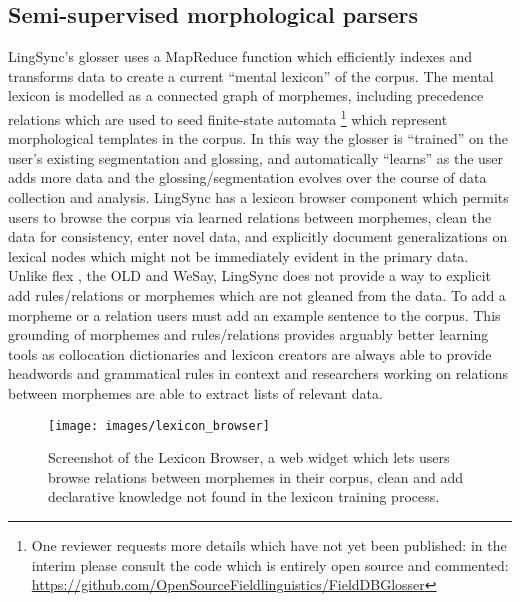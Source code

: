 \documentclass[11pt]{article}
\begin{document}
\subsection{Semi-supervised morphological parsers}
 \label{sec:lingsync-glosser} 

LingSync's glosser uses a MapReduce function which efficiently indexes and transforms data 
 to create a current ``mental lexicon'' of the corpus.  The
mental lexicon is modelled as a connected graph of morphemes, including
precedence relations which are used to seed finite-state automata \cite{Cook:2009}%
\footnote{One reviewer requests more details which have not yet been published:
    in the interim please consult the code which is entirely open source and
    commented:  \\
\url{https://github.com/OpenSourceFieldlinguistics/FieldDBGlosser}} %
which represent morphological templates in the corpus. In this way the glosser
is ``trained'' on the user's existing segmentation and glossing, and
automatically ``learns'' as the user adds more data and the
glossing/segmentation evolves over the course of data collection and analysis. 
LingSync has a lexicon browser component which permits users to browse the
corpus via learned  relations between morphemes, clean the data for
consistency, enter novel data, and explicitly document generalizations on
lexical nodes which might not be immediately evident in the primary data. 
Unlike \gls{flex} \cite{Black:2006}, the OLD and WeSay, LingSync does not
provide a way to explicit add rules/relations or morphemes which are not
gleaned from the data. To add a morpheme or a relation users must add an
example sentence to the corpus. This grounding of morphemes and rules/relations
provides arguably better learning tools as collocation dictionaries and
lexicon creators are always able to provide headwords and grammatical rules in
context and researchers working on relations between morphemes are able to
extract lists of relevant data.

\begin{figure}
\begin{center}
\texttt{[image: images/lexicon\_browser]}
\caption{Screenshot of the Lexicon Browser, a web widget which lets users
browse relations between morphemes in their corpus, clean and add
declarative knowledge not found in the lexicon training process.}
\label{lexicon_browser_screenshot}
\end{center}
\end{figure}
\end{document}
